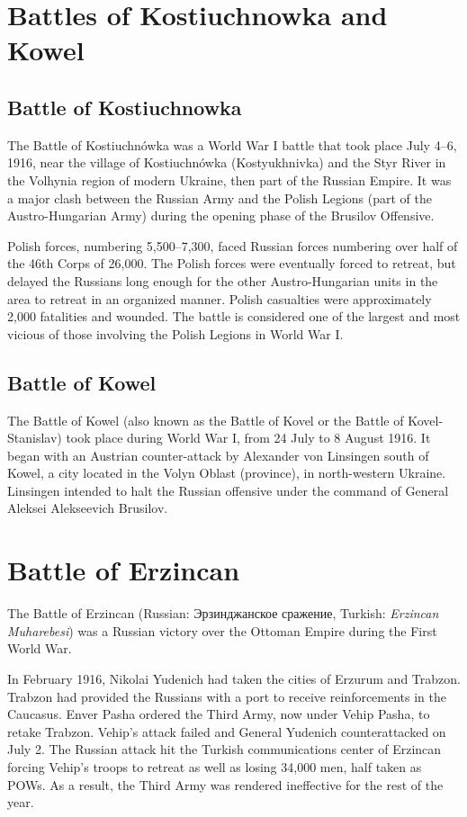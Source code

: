 \documentclass[a4paper,]{book}
\begin{document}
\section{Battles of Kostiuchnowka and Kowel}

\subsection{Battle of Kostiuchnowka}

The Battle of Kostiuchnówka was a World War I battle that took place July 4–6, 1916, near the village of Kostiuchnówka (Kostyukhnivka) and the Styr River in the Volhynia region of modern Ukraine, then part of the Russian Empire. It was a major clash between the Russian Army and the Polish Legions (part of the Austro-Hungarian Army) during the opening phase of the Brusilov Offensive.

Polish forces, numbering 5,500–7,300, faced Russian forces numbering over half of the 46th Corps of 26,000. The Polish forces were eventually forced to retreat, but delayed the Russians long enough for the other Austro-Hungarian units in the area to retreat in an organized manner. Polish casualties were approximately 2,000 fatalities and wounded. The battle is considered one of the largest and most vicious of those involving the Polish Legions in World War I.

\subsection{Battle of Kowel}

The Battle of Kowel (also known as the Battle of Kovel or the Battle of Kovel-Stanislav) took place during World War I, from 24 July to 8 August 1916. It began with an Austrian counter-attack by Alexander von Linsingen south of Kowel, a city located in the Volyn Oblast (province), in north-western Ukraine. Linsingen intended to halt the Russian offensive under the command of General Aleksei Alekseevich Brusilov.


\section{Battle of Erzincan}

The Battle of Erzincan (Russian: Эрзинджанское сражение, Turkish: \textit{Erzincan Muharebesi})  was a Russian victory over the Ottoman Empire during the First World War.

In February 1916, Nikolai Yudenich had taken the cities of Erzurum and Trabzon. Trabzon had provided the Russians with a port to receive reinforcements in the Caucasus. Enver Pasha ordered the Third Army, now under Vehip Pasha, to retake Trabzon. Vehip's attack failed and General Yudenich counterattacked on July 2. The Russian attack hit the Turkish communications center of Erzincan forcing Vehip's troops to retreat as well as losing 34,000 men, half taken as POWs. As a result, the Third Army was rendered ineffective for the rest of the year.
\end{document}
